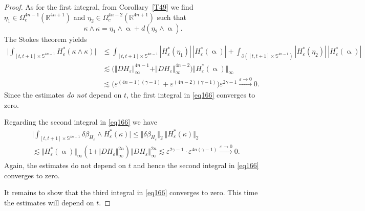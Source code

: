 \documentclass[intlimits,12pt,reqno]{amsart}
\newcommand{\Sph}{\mathbb S}
\newcommand{\R}{\mathbb R}
\newcommand{\eps}{\varepsilon}
\numberwithin{equation}{section}
\theoremstyle{definition}
\begin{document}
\begin{proof}
As for the first integral, from Corollary~\ref{T49} we find $\eta_1 \in \Omega_c^{4n-1}(\R^{4n+1})$ and $\eta_2 \in \Omega_c^{4n-2}(\R^{4n+1})$ such that 
\[
 \kappa\wedge\kappa = \eta_1 \wedge \upalpha + d(\eta_2 \wedge \upalpha).
\]
The Stokes theorem yields
\[
\begin{split}
\Bigg| \int_{[t,t+1] \times \Sph^{4n-1}} H_{\eps}^\ast(\kappa\wedge\kappa) \Bigg| 
&\leq 
\int_{[t,t+1] \times \Sph^{4n-1}} |H_{\eps}^*(\eta_1)|\, |H_{\eps}^*(\upalpha)|
+
\int_{\partial([t,t+1] \times \Sph^{4n-1})} |H_{\eps}^*(\eta_2)|\, |H_{\eps}^*(\upalpha)|\\
&\lesssim
\big(\Vert DH_{\eps}\Vert_\infty^{4n-1}+\Vert DH_{\eps}\Vert_\infty^{4n-2}\big)\Vert H_{\eps}^*(\upalpha)\Vert_\infty\\
&\lesssim
\big(\eps^{(4n-1)(\gamma-1)} + \eps^{(4n-2)(\gamma-1)}\big) \eps^{2\gamma-1} 
\xrightarrow{\eps\to 0} 0.
\end{split}
\]
Since the estimates {\em do not} depend on $t$, the first integral in \eqref{eq166} converges to zero.

Regarding the second integral in \eqref{eq166} we have
\[
\begin{split}
&\Bigg| \int_{[t,t+1] \times \Sph^{4n-1}} \delta \beta_{H_{\eps}} \wedge H_{\eps}^\ast(\kappa) \Bigg| 
\leq 
\Vert\delta \beta_{H_{\eps}}\Vert_{2}\ \Vert H_{\eps}^*(\kappa)\Vert_2\\
&\lesssim
\Vert H_{\eps}^*(\upalpha)\Vert_\infty(1+\Vert DH_{\eps}\Vert_\infty^{2n})\Vert DH_{\eps}\Vert_\infty^{2n}
\lesssim
\eps^{2\gamma-1}\cdot\eps^{4n(\gamma-1)}
\xrightarrow{\eps\to 0} 0.
\end{split}
\]
Again, the estimates do not depend on $t$ and hence the second integral in \eqref{eq166} converges to zero.

It remains to show that the third integral in \eqref{eq166} converges to zero. This time the estimates will depend on $t$.


\end{proof}
\end{document}
